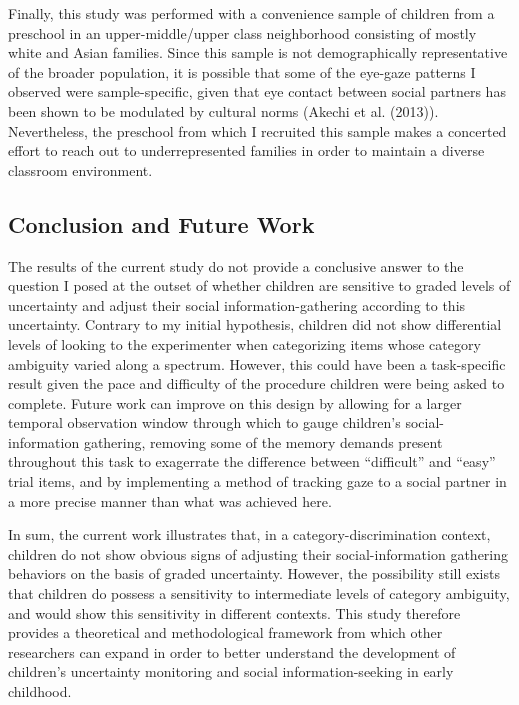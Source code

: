 \documentclass[floatsintext,man]{apa6}
\theoremstyle{definition}
\theoremstyle{definition}
\theoremstyle{definition}
\theoremstyle{remark}
\begin{document}
Finally, this study was performed with a convenience sample of children
from a preschool in an upper-middle/upper class neighborhood consisting
of mostly white and Asian families. Since this sample is not
demographically representative of the broader population, it is possible
that some of the eye-gaze patterns I observed were sample-specific,
given that eye contact between social partners has been shown to be
modulated by cultural norms (Akechi et al. (2013)). Nevertheless, the
preschool from which I recruited this sample makes a concerted effort to
reach out to underrepresented families in order to maintain a diverse
classroom environment.

\subsection{Conclusion and Future
Work}\label{conclusion-and-future-work}

The results of the current study do not provide a conclusive answer to
the question I posed at the outset of whether children are sensitive to
graded levels of uncertainty and adjust their social
information-gathering according to this uncertainty. Contrary to my
initial hypothesis, children did not show differential levels of looking
to the experimenter when categorizing items whose category ambiguity
varied along a spectrum. However, this could have been a task-specific
result given the pace and difficulty of the procedure children were
being asked to complete. Future work can improve on this design by
allowing for a larger temporal observation window through which to gauge
children's social-information gathering, removing some of the memory
demands present throughout this task to exagerrate the difference
between \enquote{difficult} and \enquote{easy} trial items, and by
implementing a method of tracking gaze to a social partner in a more
precise manner than what was achieved here.

In sum, the current work illustrates that, in a category-discrimination
context, children do not show obvious signs of adjusting their
social-information gathering behaviors on the basis of graded
uncertainty. However, the possibility still exists that children do
possess a sensitivity to intermediate levels of category ambiguity, and
would show this sensitivity in different contexts. This study therefore
provides a theoretical and methodological framework from which other
researchers can expand in order to better understand the development of
children's uncertainty monitoring and social information-seeking in
early childhood.
\end{document}

